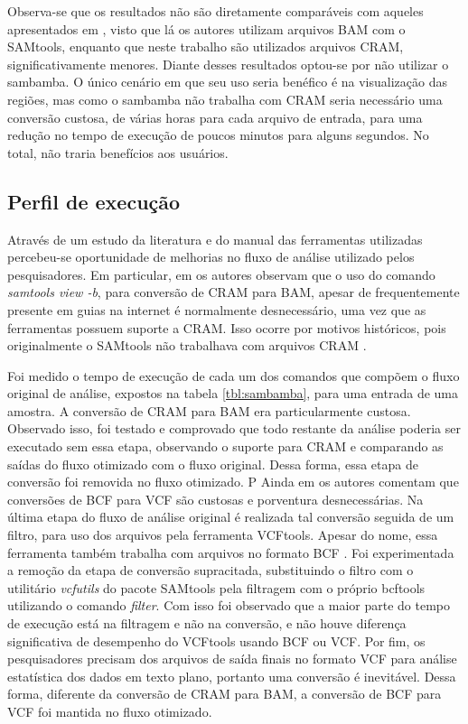 \documentclass[cic,tc]{iiufrgs}
\begin{document}
{Observa-se que os resultados não são diretamente comparáveis com aqueles
apresentados em \cite{tarasov2015sambamba}, visto que lá os autores utilizam
arquivos BAM com o SAMtools, enquanto que neste trabalho são utilizados
arquivos CRAM, significativamente menores. Diante desses resultados optou-se
por não utilizar o sambamba. O único cenário em que seu uso seria benéfico é na
visualização das regiões, mas como o sambamba não trabalha com CRAM seria
necessário uma conversão custosa, de várias horas para cada arquivo de entrada,
para uma redução no tempo de execução de poucos minutos para alguns segundos.
No total, não traria benefícios aos usuários.

\subsection{Perfil de execução}

Através de um estudo da literatura e do manual das ferramentas utilizadas
percebeu-se oportunidade de melhorias no fluxo de análise utilizado pelos
pesquisadores. Em particular, em \cite{danecek2021twelve} os autores observam
que o uso do comando \textit{samtools view -b}, para conversão de CRAM para
BAM, apesar de frequentemente presente em guias na internet é normalmente
desnecessário, uma vez que as ferramentas possuem suporte a CRAM. Isso ocorre
por motivos históricos, pois originalmente o SAMtools não trabalhava com
arquivos CRAM \cite{danecek2021twelve}.

Foi medido o tempo de execução de cada um dos comandos que compõem o fluxo
original de análise, expostos na tabela \ref{tbl:sambamba}, para uma entrada
de uma amostra. A conversão de CRAM para BAM era particularmente custosa.
Observado isso, foi testado e comprovado que todo restante da análise poderia
ser executado sem essa etapa, observando o suporte para CRAM e comparando as
saídas do fluxo otimizado com o fluxo original. Dessa forma, essa etapa de
conversão foi removida no fluxo otimizado.
P
Ainda em \cite{danecek2021twelve} os autores comentam que conversões de BCF
para VCF são custosas e porventura desnecessárias. Na última etapa do fluxo de
análise original é realizada tal conversão seguida de um filtro, para uso dos
arquivos pela ferramenta VCFtools. Apesar do nome, essa ferramenta também
trabalha com arquivos no formato BCF \cite{man2015vcftools}. Foi experimentada a
remoção da etapa de conversão supracitada, substituindo o filtro com o
utilitário \textit{vcfutils} do pacote SAMtools pela filtragem com o próprio
bcftools utilizando o comando \textit{filter}. Com isso foi observado que a
maior parte do tempo de execução está na filtragem e não na conversão, e não
houve diferença significativa de desempenho do VCFtools usando BCF ou VCF. Por
fim, os pesquisadores precisam dos arquivos de saída finais no formato VCF para
análise estatística dos dados em texto plano, portanto uma conversão é
inevitável. Dessa forma, diferente da conversão de CRAM para BAM, a conversão
de BCF para VCF foi mantida no fluxo otimizado.

}
\end{document}
